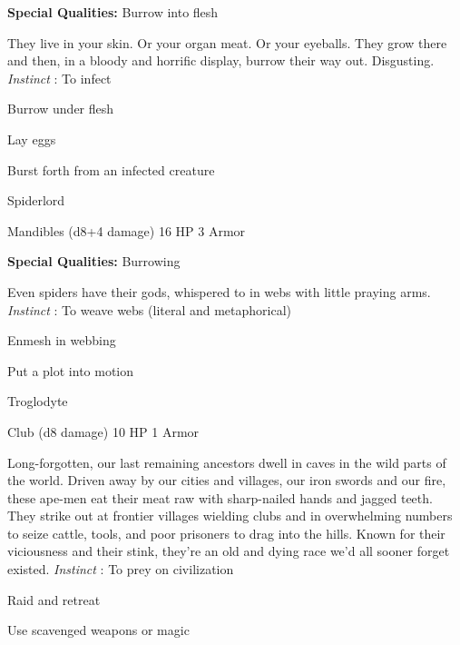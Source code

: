  
\startMonsterQualities
{\bf Special Qualities:}  Burrow into flesh
\stopMonsterQualities
 
\startMonsterDescription
They live in your skin. Or your organ meat. Or your eyeballs. They grow there and then, in a bloody and horrific display, burrow their way out. Disgusting. {\em Instinct} : To infect
\stopMonsterDescription
 
\startitemize[1,packed]

\item Burrow under flesh

 
\item Lay eggs

 
\item Burst forth from an infected creature


\stopitemize
 
\startMonsterName
Spiderlord	 
\stopMonsterName
 

Mandibles (d8+4 damage)	16 HP	3 Armor

 


 
\startMonsterQualities
{\bf Special Qualities:}  Burrowing
\stopMonsterQualities
 
\startMonsterDescription
Even spiders have their gods, whispered to in webs with little praying arms. {\em Instinct} : To weave webs (literal and metaphorical)
\stopMonsterDescription
 
\startitemize[1,packed]

\item Enmesh in webbing

 
\item Put a plot into motion


\stopitemize
 
\startMonsterName
Troglodyte	 
\stopMonsterName
 

Club (d8 damage)	10 HP	1 Armor

 


 
\startMonsterDescription
Long-forgotten, our last remaining ancestors dwell in caves in the wild parts of the world. Driven away by our cities and villages, our iron swords and our fire, these ape-men eat their meat raw with sharp-nailed hands and jagged teeth. They strike out at frontier villages wielding clubs and in overwhelming numbers to seize cattle, tools, and poor prisoners to drag into the hills. Known for their viciousness and their stink, they’re an old and dying race we’d all sooner forget existed. {\em Instinct} : To prey on civilization
\stopMonsterDescription
 
\startitemize[1,packed]

\item Raid and retreat

 
\item Use scavenged weapons or magic


\stopitemize
 

 




